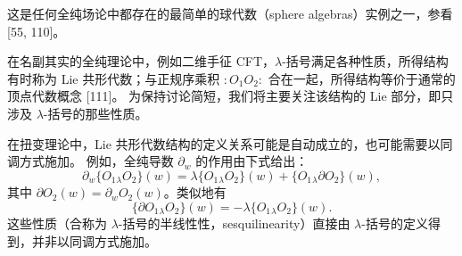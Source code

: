 这是任何全纯场论中都存在的最简单的球代数（sphere algebras）实例之一，参看 [55, 110]。

在名副其实的全纯理论中，例如二维手征 CFT，$\lambda$-括号满足各种性质，所得结构有时称为 Lie 共形代数；与正规序乘积 $:O_1O_2:$ 合在一起，所得结构等价于通常的顶点代数概念 [111]。
为保持讨论简短，我们将主要关注该结构的 Lie 部分，即只涉及 $\lambda$-括号的那些性质。

在扭变理论中，Lie 共形代数结构的定义关系可能是自动成立的，也可能需要以同调方式施加。
例如，全纯导数 $\partial_w$ 的作用由下式给出：
\begin{equation}\tag{3.64}
\partial_w\{O_1{}_\lambda O_2\}(w)=\lambda\{O_1{}_\lambda O_2\}(w)+\{O_1{}_\lambda\partial O_2\}(w),
\end{equation}
其中 $\partial O_2(w)=\partial_wO_2(w)$。类似地有
\begin{equation}\tag{3.65}
\{\partial O_1{}_\lambda O_2\}(w)=-\lambda\{O_1{}_\lambda O_2\}(w).
\end{equation}
这些性质（合称为 $\lambda$-括号的半线性性，sesquilinearity）直接由 $\lambda$-括号的定义得到，并非以同调方式施加。

